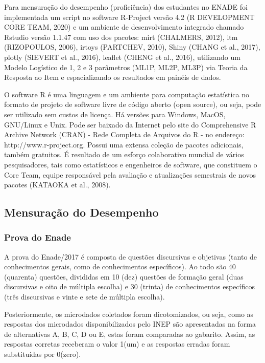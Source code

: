 \documentclass[12pt]{article}
\begin{document}
Para mensuração do desempenho (proficiência) dos estudantes no ENADE foi implementada um script no software R-Project versão 4.2 (R DEVELOPMENT CORE TEAM, 2020) e um ambiente de desenvolvimento integrado chamado Rstudio versão 1.1.47 com uso dos pacotes: mirt (CHALMERS, 2012), ltm (RIZOPOULOS, 2006), irtoys (PARTCHEV, 2010), Shiny (CHANG et al., 2017), plotly (SIEVERT et al., 2016), leaflet (CHENG et al., 2016), utilizando um Modelo Logístico de 1, 2 e 3 parâmetros (ML1P, ML2P, ML3P) via Teoria da Resposta ao Item e espacializando os resultados em painéis de dados.


O software R é uma linguagem e um ambiente para computação estatística no formato de projeto de software livre de código aberto (open source), ou seja, pode ser utilizado sem custos de licença. Há versões para Windows, MacOS, GNU/Linux e Unix. Pode ser baixado da Internet pelo site do Comprehensive R Archive Network (CRAN) - Rede Completa de Arquivos do R - no endereço: http://www.r-project.org. Possui uma extensa coleção de pacotes adicionais, também gratuitos. É resultado de um esforço colaborativo mundial de vários pesquisadores, tais como estatísticos e engenheiros de software, que constituem o Core Team, equipe responsável pela avaliação e atualizações semestrais de novos pacotes (KATAOKA et al., 2008).




\subsection{Mensuração do Desempenho}
\subsubsection{Prova do Enade}
\label{sec:MET}

A prova do Enade/2017 é composta de questões discursivas e objetivas (tanto de conhecimentos gerais, como de conhecimentos específicos). Ao todo são 40 (quarenta) questões, divididas em 10 (dez) questões de formação geral (duas discursivas e oito de múltipla escolha) e 30 (trinta) de conhecimentos específicos (três discursivas e vinte e sete de múltipla escolha).\vskip0.3cm

Posteriormente, os microdados coletados foram dicotomizados, ou seja, como as respostas dos microdados disponibilizados pelo INEP são apresentadas na forma de alternativas A, B, C, D ou E, estas foram comparadas ao gabarito. Assim, as respostas corretas receberam o valor 1(um) e as respostas erradas foram substituídas por 0(zero). 
\end{document}
